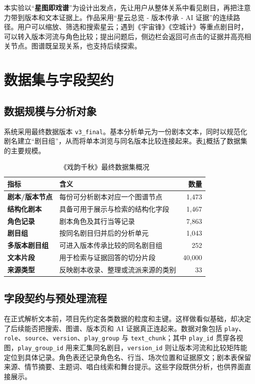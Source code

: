 \documentclass[12pt,a4paper]{article}
\newcommand{\keyterm}[1]{\textcolor{OperaRed}{\textbf{#1}}}
\begin{document}
本实验以“\keyterm{星图即戏谱}”为设计出发点，先让用户从整体关系中看见剧目，再把注意力带到版本和文本证据上。作品采用“星云总览 - 版本传承 - AI 证据”的连续路径。用户可以缩放、筛选和搜索星云；遇到《宇宙锋》《空城计》等重点剧目时，可以转入版本河流与角色比较；提出问题后，侧边栏会返回可点击的证据并高亮相关节点。图谱既呈现关系，也支持后续探索。

\section{数据集与字段契约}
\subsection{数据规模与分析对象}
系统采用最终数据版本 \texttt{v3\_final}。基本分析单元为一份剧本文本，同时以规范化剧名建立“剧目组”，从而将单本浏览与同名版本比较连接起来。表\ref{tab:dataset}概括了数据集的主要规模。

\begin{table}[H]
  \centering
  \caption{《戏韵千秋》最终数据集概况}
  \label{tab:dataset}
  \renewcommand{\arraystretch}{1.35}
  \begin{tabularx}{0.93\textwidth}{>{\bfseries}l X r}
    \toprule
    指标 & 含义 & 数量 \\
    \midrule
    剧本/版本节点 & 每份可分析剧本对应一个图谱节点 & 1,473 \\
    结构化剧本 & 具备可用于展示与检索的结构化字段 & 1,467 \\
    角色记录 & 剧本角色及其行当等记录 & 7,863 \\
    剧目组 & 按同名剧目归并后的分析单元 & 1,043 \\
    多版本剧目组 & 可进入版本传承比较的同名剧目组 & 252 \\
    文本片段 & 用于检索与证据回答的切分片段 & 40,000 \\
    来源类型 & 反映剧本收录、整理或流派来源的类别 & 33 \\
    \bottomrule
  \end{tabularx}
\end{table}

\subsection{字段契约与预处理流程}
在正式解析文本前，项目先约定各类数据的粒度和主键。这样做看似基础，却决定了后续能否把搜索、图谱、版本页和 AI 证据真正连起来。数据对象包括 \texttt{play}、\texttt{role}、\texttt{source}、\texttt{version}、\texttt{play\_group} 与 \texttt{text\_chunk}；其中 \texttt{play\_id} 贯穿各视图，\texttt{play\_group\_id} 用来汇集同名剧目，\texttt{version\_id} 则让版本河流和比较矩阵能定位到具体记录。角色表还记录角色名、行当、场次位置和证据原文；剧本表保留来源、情节摘要、主题词、唱白线索和舞台提示。这些字段既供分析，也供界面直接展示。
\end{document}
